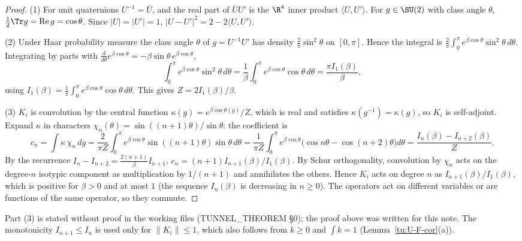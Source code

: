 \begin{proof}
(1) For unit quaternions $U^{-1}=\bar U$, and the real part of $\bar UU'$ is the $\R^4$ inner product
$\langle U,U'\rangle$. For $g\in\SU(2)$ with class angle $\theta$, $\tfrac12\Tr g=\operatorname{Re}g=\cos\theta$.
Since $|U|=|U'|=1$, $|U-U'|^2=2-2\langle U,U'\rangle$.

(2) Under Haar probability measure the class angle $\theta$ of $g=U^{-1}U'$ has density
$\frac2\pi\sin^2\theta$ on $[0,\pi]$. Hence the integral is
$\frac2\pi\int_0^\pi e^{\beta\cos\theta}\sin^2\theta\,d\theta$. Integrating by parts with
$\frac{d}{d\theta}e^{\beta\cos\theta}=-\beta\sin\theta\,e^{\beta\cos\theta}$,
\[
\int_0^\pi e^{\beta\cos\theta}\sin^2\theta\,d\theta=\frac1\beta\int_0^\pi e^{\beta\cos\theta}\cos\theta\,d\theta
=\frac{\pi I_1(\beta)}{\beta},
\]
using $I_1(\beta)=\frac1\pi\int_0^\pi e^{\beta\cos\theta}\cos\theta\,d\theta$. This gives $Z=2I_1(\beta)/\beta$.

(3) $K_i$ is convolution by the central function $\kappa(g)=e^{\beta\cos\theta(g)}/Z$, which is real and
satisfies $\kappa(g^{-1})=\kappa(g)$, so $K_i$ is self-adjoint. Expand $\kappa$ in characters
$\chi_n(\theta)=\sin((n+1)\theta)/\sin\theta$: the coefficient is
\[
c_n=\int\kappa\,\chi_n\,dg=\frac{2}{\pi Z}\int_0^\pi e^{\beta\cos\theta}\sin((n+1)\theta)\sin\theta\,d\theta
=\frac{1}{\pi Z}\int_0^\pi e^{\beta\cos\theta}\bigl(\cos n\theta-\cos(n+2)\theta\bigr)d\theta
=\frac{I_n(\beta)-I_{n+2}(\beta)}{Z}.
\]
By the recurrence $I_n-I_{n+2}=\frac{2(n+1)}{\beta}I_{n+1}$, $c_n=(n+1)I_{n+1}(\beta)/I_1(\beta)$. By Schur
orthogonality, convolution by $\chi_n$ acts on the degree-$n$ isotypic component as multiplication by
$1/(n+1)$ and annihilates the others. Hence $K_i$ acts on degree $n$ as $I_{n+1}(\beta)/I_1(\beta)$, which is
positive for $\beta>0$ and at most $1$ (the sequence $I_{n}(\beta)$ is decreasing in $n\ge0$). The
operators act on different variables or are functions of the same operator, so they commute.
\end{proof}

\begin{remark}
Part (3) is stated without proof in the working files (TUNNEL\_THEOREM \S0); the proof above was
written for this note. The monotonicity $I_{n+1}\le I_n$ is used only for $\|K_i\|\le1$, which also follows
from $k\ge0$ and $\int k=1$ (Lemma~\ref{tu:U-F-cor}(a)).
\end{remark}

